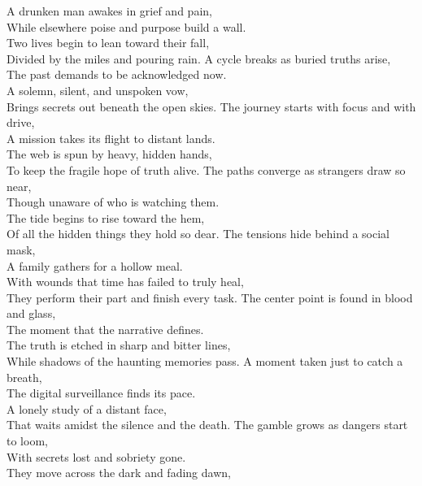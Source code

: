 \begin{lyrics}
A drunken man awakes in grief and pain,\\
While elsewhere poise and purpose build a wall.\\
Two lives begin to lean toward their fall,\\
Divided by the miles and pouring rain.
A cycle breaks as buried truths arise,\\
The past demands to be acknowledged now.\\
A solemn, silent, and unspoken vow,\\
Brings secrets out beneath the open skies.
The journey starts with focus and with drive,\\
A mission takes its flight to distant lands.\\
The web is spun by heavy, hidden hands,\\
To keep the fragile hope of truth alive.
The paths converge as strangers draw so near,\\
Though unaware of who is watching them.\\
The tide begins to rise toward the hem,\\
Of all the hidden things they hold so dear.
The tensions hide behind a social mask,\\
A family gathers for a hollow meal.\\
With wounds that time has failed to truly heal,\\
They perform their part and finish every task.
The center point is found in blood and glass,\\
The moment that the narrative defines.\\
The truth is etched in sharp and bitter lines,\\
While shadows of the haunting memories pass.
A moment taken just to catch a breath,\\
The digital surveillance finds its pace.\\
A lonely study of a distant face,\\
That waits amidst the silence and the death.
The gamble grows as dangers start to loom,\\
With secrets lost and sobriety gone.\\
They move across the dark and fading dawn,\\

\end{lyrics}
